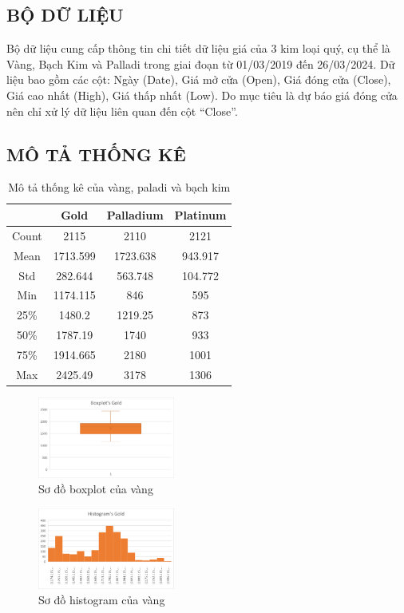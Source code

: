 \subsection{BỘ DỮ LIỆU}
Bộ dữ liệu cung cấp thông tin chi tiết dữ liệu giá của 3 kim loại quý, cụ thể là Vàng, Bạch Kim và Palladi trong giai đoạn từ 01/03/2019 đến 26/03/2024. Dữ liệu bao gồm các cột: Ngày (Date), Giá mở cửa (Open), Giá đóng cửa (Close), Giá cao nhất (High), Giá thấp nhất (Low). Do mục tiêu là dự báo giá đóng cửa nên chỉ xử lý dữ liệu liên quan đến cột “Close”.

\subsection{MÔ TẢ THỐNG KÊ}
\begin{table}[htbp]
  \centering
\begin{tabular}{|c|c|c|c|}
    \hline
     \  & Gold & Palladium & Platinum \\ \hline
     Count & 2115 & 2110 & 2121\\ \hline
     Mean & 1713.599 & 1723.638 & 943.917\\ \hline
     Std & 282.644 & 563.748 & 104.772\\ \hline
     Min & 1174.115 & 846 & 595\\ \hline
     25\% & 1480.2 & 1219.25 & 873\\ \hline
     50\% & 1787.19 & 1740 & 933\\ \hline
     75\% & 1914.665 & 2180 & 1001\\ \hline
     Max & 2425.49 & 3178 & 1306\\ \hline
\end{tabular}
\caption{Mô tả thống kê của vàng, paladi và bạch kim}
\end{table}

\begin{figure}[htbp]
\centerline{\includegraphics[width=0.4\textwidth]{img/Picture2.png}}
\caption{Sơ đồ boxplot của vàng}
\label{fig}
\end{figure}

\begin{figure}[htbp]
\centerline{\includegraphics[width=0.4\textwidth]{img/Picture5.png}}
\caption{Sơ đồ histogram của vàng}
\label{fig}
\end{figure}

